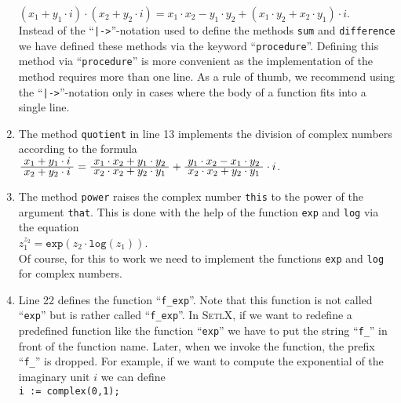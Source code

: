 \begin{enumerate}
      $(x_1 + y_1 \cdot i) \cdot (x_2 + y_2 \cdot i) = 
       x_1 \cdot x_2 - y_1 \cdot y_2 + (x_1 \cdot y_2 + x_2 \cdot y_1) \cdot i
      $.
      \\[0.2cm]
      Instead of the ``\texttt{|->}''-notation used to define the methods \texttt{sum} and
      \texttt{difference} we have defined these methods via the keyword
      ``\texttt{procedure}''.  Defining this method via ``\texttt{procedure}'' is more
      convenient as the implementation of the method requires more than one line.
      As a rule of thumb, we recommend using the ``\texttt{|->}''-notation only in cases
      where the body of a function fits into a single line.
\item The method \texttt{quotient} in line 13 implements the division of complex numbers
      according to the formula
      \\[0.2cm]
      \hspace*{1.3cm}
      ${\displaystyle\; x_1 + y_1 \cdot i \;\over \displaystyle x_2 + y_2 \cdot i} = 
       {\displaystyle\; x_1 \cdot x_2 + y_1 \cdot y_2 \;\over \displaystyle x_2 \cdot x_2 + y_2 \cdot y_1} +
       {\displaystyle\; y_1 \cdot x_2 - x_1 \cdot y_2 \;\over \displaystyle x_2 \cdot x_2 + y_2 \cdot y_1} \cdot i
      $.
\item The method \texttt{power} raises the complex number \texttt{this} to the power of
      the argument \texttt{that}.  This is done with the help of the function
      \texttt{exp} and \texttt{log} via the equation
      \\[0.2cm]
      \hspace*{1.3cm}
      $z_1^{z_2} = \mathtt{exp}(z_2 \cdot \mathtt{log}(z_1))$.
      \\[0.2cm]
      Of course, for this to work we need to implement the functions \texttt{exp} and
      \texttt{log} for complex numbers.
\item Line 22 defines the function ``\texttt{f\_exp}''.  Note that this function is not
      called ``\texttt{exp}'' but is rather called ``\texttt{f\_exp}''.  In
      \textsc{SetlX}, if we want to redefine a predefined function like the function
      ``\texttt{exp}'' we have to put the string ``\texttt{f\_}'' in front of the function
      name.  Later, when we invoke the function, the prefix ``\texttt{f\_}'' is dropped.
      For example, if we want to compute the exponential of the imaginary unit $i$ we can
      define
      \\[0.2cm]
      \hspace*{1.3cm}
      \texttt{i := complex(0,1);}

\end{enumerate}
